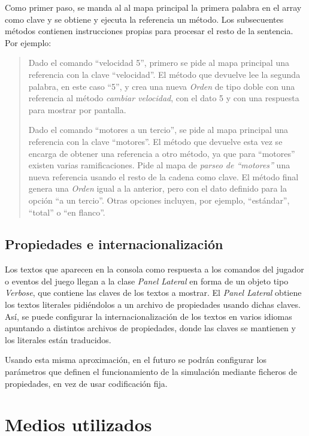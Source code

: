 \documentclass[a4paper,
	11pt,
	parskip=full,
	bibliography=totoc,
	twoside
	]{scrartcl}
\let\oldsection\section
\def\section{\cleardoubleoddpage\oldsection}
\begin{document}
			Como primer paso, se manda al al mapa principal la primera palabra en el array como clave y se obtiene y ejecuta la referencia un método. Los subsecuentes métodos contienen instrucciones propias para procesar el resto de la sentencia. Por ejemplo:
			\begin{quote}
				Dado el comando ``velocidad 5'', primero se pide al mapa principal una referencia con la clave ``velocidad''. El método que devuelve lee la segunda palabra, en este caso ``5'', y crea una nueva \textit{Orden} de tipo doble con una referencia al método \textit{cambiar velocidad}, con el dato 5 y con una respuesta para mostrar por pantalla.
				
				Dado el comando ``motores a un tercio'', se pide al mapa principal una referencia con la clave ``motores''. El método que devuelve esta vez se encarga de obtener una referencia a otro método, ya que para ``motores'' existen varias ramificaciones. Pide al mapa de \textit{parseo de ``motores''} una nueva referencia usando el resto de la cadena como clave. El método final genera una \textit{Orden} igual a la anterior, pero con el dato definido para la opción ``a un tercio''. Otras opciones incluyen, por ejemplo, ``estándar'', ``total'' o ``en flanco''.
			\end{quote}
			

	
	\subsection{Propiedades e internacionalización}
	\label{subsec:propiedades_internacionalizacion}
		Los textos que aparecen en la consola \cite{so_custom_font} como respuesta a los comandos del jugador o eventos del juego llegan a la clase \textit{Panel Lateral} en forma de un objeto tipo \textit{Verbose}, que contiene las claves de los textos a mostrar. El \textit{Panel Lateral} obtiene los textos literales pidiéndolos a un archivo de propiedades usando dichas claves. Así, se puede configurar la internacionalización de los textos en varios idiomas apuntando a distintos archivos de propiedades, donde las claves se mantienen y los literales están traducidos.
		
		Usando esta misma aproximación, en el futuro se podrán configurar los parámetros que definen el funcionamiento de la simulación mediante ficheros de propiedades, en vez de usar codificación fija.
	
\section{Medios utilizados}
\label{sec:medios}
\onehalfspacing
\end{document}
